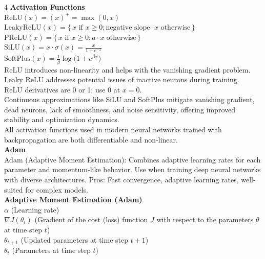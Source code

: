 \documentclass[8pt]{extarticle}
\begin{document}
\begin{multicols}{4}
\vspace{2pt}\textbf{Activation Functions}\\
$\text{ReLU}(x) = (x)^{+} = \max(0, x)$\\
$\text{LeakyReLU}(x) = \{\, x \text{ if } x \ge 0; \text{negative slope}\cdot x \text{ otherwise} \,\}$\\
$\text{PReLU}(x) = \{\, x \text{ if } x \ge 0; a\cdot x \text{ otherwise} \,\}$\\
$\text{SiLU}(x) = x \cdot \sigma(x) = \frac{x}{1 + e^{-x}}$\\
$\text{SoftPlus}(x) = \frac{1}{\beta}\log\!\bigl(1 + e^{\beta x}\bigr)$\\
ReLU introduces non-linearity and helps with the vanishing gradient problem.\\
Leaky ReLU addresses potential issues of inactive neurons during training.\\
ReLU derivatives are 0 or 1; use 0 at $x = 0$.\\
Continuous approximations like SiLU and SoftPlus mitigate vanishing gradient, dead neurons, lack of smoothness, and noise sensitivity, offering improved stability and optimization dynamics.\\
All activation functions used in modern neural networks trained with backpropagation are both differentiable and non-linear.\\
\vspace{2pt}\textbf{Adam}\\
Adam (Adaptive Moment Estimation): Combines adaptive learning rates for each parameter and momentum-like behavior. Use when training deep neural networks with diverse architectures. Pros: Fast convergence, adaptive learning rates, well-suited for complex models.\\
\vspace{2pt}\textbf{Adaptive Moment Estimation (Adam)}\\
$\alpha$ (Learning rate)\\
$\nabla J(\theta_{t})$ (Gradient of the cost (loss) function $J$ with respect to the parameters $\theta$ at time step $t$)\\
$\theta_{t+1}$ (Updated parameters at time step $t+1$)\\
$\theta_{t}$ (Parameters at time step $t$)\\


\end{multicols}
\end{document}
